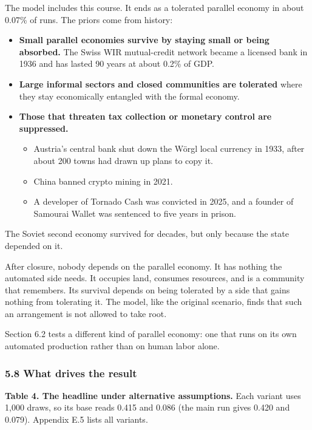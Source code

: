 \documentclass[
  10pt,
]{article}
\providecommand{\tightlist}{%
  \setlength{\itemsep}{0pt}\setlength{\parskip}{0pt}}
\begin{document}
The model includes this course. It ends as a tolerated parallel economy in about 0.07\% of runs. The
priors come from history:

\begin{itemize}
\tightlist
\item
  \textbf{Small parallel economies survive by staying small or being absorbed.} The Swiss WIR
  mutual-credit network became a licensed bank in 1936 and has lasted 90 years at about 0.2\% of
  GDP.
\item
  \textbf{Large informal sectors and closed communities are tolerated} where they stay economically
  entangled with the formal economy.
\item
  \textbf{Those that threaten tax collection or monetary control are suppressed.}

  \begin{itemize}
  \tightlist
  \item
    Austria's central bank shut down the Wörgl local currency in 1933, after about 200 towns had
    drawn up plans to copy it.
  \item
    China banned crypto mining in 2021.
  \item
    A developer of Tornado Cash was convicted in 2025, and a founder of Samourai Wallet was
    sentenced to five years in prison.
  \end{itemize}
\end{itemize}

The Soviet second economy survived for decades, but only because the state depended on it.

After closure, nobody depends on the parallel economy. It has nothing the automated side needs. It
occupies land, consumes resources, and is a community that remembers. Its survival depends on being
tolerated by a side that gains nothing from tolerating it. The model, like the original scenario,
finds that such an arrangement is not allowed to take root.

Section 6.2 tests a different kind of parallel economy: one that runs on its own automated
production rather than on human labor alone.

\subsubsection{5.8 What drives the result}\label{what-drives-the-result}

\textbf{Table 4. The headline under alternative assumptions.} Each variant uses 1,000 draws, so its
base reads 0.415 and 0.086 (the main run gives 0.420 and 0.079). Appendix E.5 lists all variants.
\end{document}
